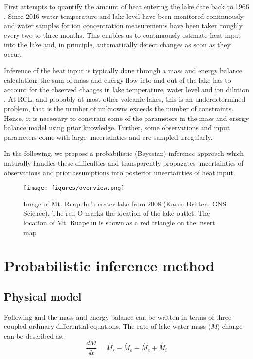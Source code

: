 \documentclass{bmc_template/bmcart}
\begin{document}
First attempts to quantify the amount of heat entering the lake date back to
1966 \citep{Dibble1966}. Since 2016 water temperature and lake level have been
monitored continuously and water samples for ion concentration measurements have
been taken roughly every two to three months. This enables us to continuously
estimate heat input into the lake and, in principle, automatically detect
changes as soon as they occur.

Inference of the heat input is typically done through a mass and energy balance
calculation: the sum of mass and energy flow into and out of the lake has to
account for the observed changes in lake temperature, water level and ion
dilution \cite{Hurst1981, Hurst1991, Stevenson1992, Fournier2009, Scott1994}. At
RCL, and probably at most other volcanic lakes, this is an underdetermined
problem, that is the number of unknowns exceeds the number of constraints.
Hence, it is necessary to constrain some of the parameters in the mass and
energy balance model using prior knowledge. Further, some observations and input
parameters come with large uncertainties and are sampled irregularly.

In the following, we propose a probabilistic (Bayesian) inference approach which
naturally handles these difficulties and transparently propagates uncertainties of
observations and prior assumptions into posterior uncertainties of heat input.

\begin{figure}
\texttt{[image: figures/overview.png]}  
\caption{Image of Mt. Ruapehu's crater lake from 2008 (\textcopyright Karen
	Britten, GNS Science). The red O marks the location of the lake outlet. The
	location of Mt. Ruapehu is shown as a red triangle on the insert map.}
  \label{overview}
\end{figure}


\section{Probabilistic inference method}\label{Pim}

\subsection{Physical model}\label{phm}

Following \cite{Hurst1991} and \cite{Stevenson1992} the mass and energy balance
can be written in terms of three coupled ordinary differential equations. The
rate of lake water mass ($M$) change can be described as:
\begin{equation}\label{ode_M}
	\frac{dM}{dt} = \dot{M_s} - \dot{M_o} - \dot{M_e} + \dot{M_i}
\end{equation}
\end{document}
